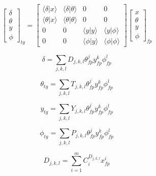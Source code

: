 \begin{equation} \label{eq:matrix}
	\left[ \begin{matrix}
		\delta \\
		\theta \\
		y	   \\
		\phi
	\end{matrix} \right]_{tg}
	=
	\left[ \begin{matrix}
		\langle \delta | x \rangle & \langle \delta | \theta \rangle & 0 & 0 \\
		\langle \theta | x \rangle & \langle \theta | \theta \rangle & 0 & 0 \\
		0 & 0 & \langle y | y \rangle & \langle y | \phi \rangle \\
		0 & 0 & \langle \phi | y \rangle & \langle \phi | \phi \rangle 
	\end{matrix} \right]
		\left[ \begin{matrix}
		x \\
		\theta \\
		y	   \\
		\phi
	\end{matrix} \right]_{fp}
\end{equation}

\begin{equation} \label{eq:delta_tg}
	\delta = \sum_{j,k,l} D_{j,k,l} \theta_{fp}^j y_{fp}^k \phi_{fp}^l
\end{equation}

\begin{equation} \label{eq:theta_tg}
	\theta_{tg} = \sum_{j,k,l} T_{j,k,l} \theta_{fp}^j y_{fp}^k \phi_{fp}^l
\end{equation}

\begin{equation} \label{eq:y_tg}
	y_{tg} = \sum_{j,k,l} Y_{j,k,l} \theta_{fp}^j y_{fp}^k \phi_{fp}^l
\end{equation}

\begin{equation} \label{eq:phi_tg}
	\phi_{tg} = \sum_{j,k,l} P_{j,k,l} \theta_{fp}^j y_{fp}^k \phi_{fp}^l
\end{equation}

\begin{equation} \label{eq:tensor}
	D_{j,k,l} = \sum_{i=1}^m C_i^{D_{j,k,l}} x_{fp}^i
\end{equation}

